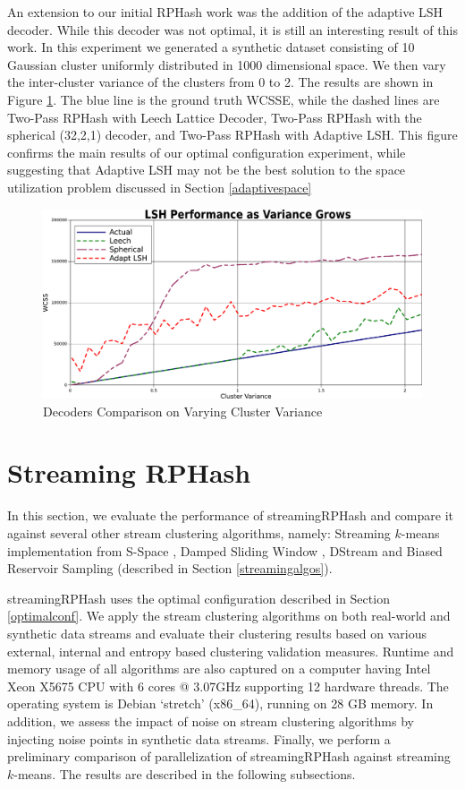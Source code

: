An extension to our initial \textsf{RPHash} work was the addition of the adaptive LSH decoder.  While this
decoder was not optimal, it is still an interesting result of this work.  In this experiment we
generated a synthetic dataset consisting of 10 Gaussian cluster uniformly distributed in 1000
dimensional space.  We then vary the inter-cluster variance of the clusters from 0 to 2.  The results
are shown in Figure \ref{twrpvothers}.  The blue line is the ground truth WCSSE, while the dashed
lines are Two-Pass \textsf{RPHash} with Leech Lattice Decoder, Two-Pass \textsf{RPHash} with the spherical (32,2,1)
decoder, and Two-Pass \textsf{RPHash} with Adaptive LSH.  This figure confirms the main results of our optimal
configuration experiment, while suggesting that Adaptive LSH may not be the best solution to the
space utilization problem discussed in Section \ref{adaptivespace}

\begin{figure}
     \centering
     \includegraphics[width=.7\linewidth]{figs/clustervarianceVsDecoders} 
      \caption{Decoders Comparison on Varying Cluster Variance\label{twrpvothers}}
\end{figure}

\section{Streaming RPHash}

In this section, we evaluate the performance of \textsf{streamingRPHash} and compare it against
several other stream clustering algorithms, namely: Streaming $k$-means \cite{braverman}
implementation from S-Space \cite{sspace}, Damped Sliding Window \cite{zhu}, DStream \cite{dstream}
and Biased Reservoir Sampling \cite{ccaggarwal} (described in Section \ref{streamingalgos}).

\textsf{streamingRPHash} uses the optimal configuration described in Section \ref{optimalconf}.  We
apply the stream clustering algorithms on both real-world and synthetic data streams and evaluate
their clustering results based on various external, internal and entropy based clustering validation
measures.  Runtime and memory usage of all algorithms are also captured on a computer having Intel
Xeon X5675 CPU with 6 cores @ 3.07GHz supporting 12 hardware threads.  The operating system is
Debian `stretch' (x86\_64), running on 28 GB memory.  In addition, we assess the impact of noise on
stream clustering algorithms by injecting noise points in synthetic data streams.  Finally, we
perform a preliminary comparison of parallelization of \textsf{streamingRPHash} against streaming
$k$-means.  The results are described in the following subsections.

